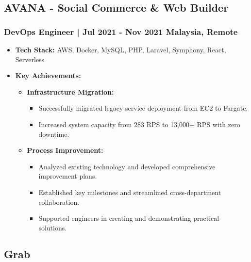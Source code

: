 \documentclass[11pt]{article}
\begin{document}
\subsection{AVANA - Social Commerce \& Web Builder}
\subsubsection{DevOps Engineer | Jul 2021 - Nov 2021 \hfill Malaysia, Remote}
\begin{itemize}
    \item \textbf{Tech Stack:} AWS, Docker, MySQL, PHP, Laravel, Symphony, React, Serverless
    \item \textbf{Key Achievements:}
    \begin{itemize}
        \item \textbf{Infrastructure Migration:}
        \begin{itemize}
            \item Successfully migrated legacy service deployment from EC2 to Fargate.
            \item Increased system capacity from 283 RPS to 13,000+ RPS with zero downtime.
        \end{itemize}
        \item \textbf{Process Improvement:}
        \begin{itemize}
            \item Analyzed existing technology and developed comprehensive improvement plans.
            \item Established key milestones and streamlined cross-department collaboration.
            \item Supported engineers in creating and demonstrating practical solutions.
        \end{itemize}
    \end{itemize}
\end{itemize}

\subsection{Grab}
\end{document}
